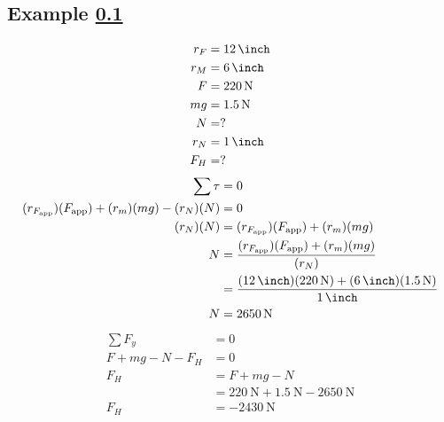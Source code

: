 \documentclass{article}
\begin{document}
\subsection{Example \ref{example:2}} \label{example:2}
\begin{align*}
	r_F & = \SI{12}{\inch} \\
	r_M & = \SI{6}{\inch} \\
	F & = \SI{220}{\newton} \\
	mg & = \SI{1.5}{\newton} \\
	N & = ? \\
	r_N & = \SI{1}{\inch} \\
	F_H & = ?
\end{align*}
\begin{align*}
	\sum \tau & = 0 \\
	(r_{F_\text{app}})(F_\text{app}) + (r_m)(mg) - (r_N)(N) & = 0 \\
	(r_N)(N) & = (r_{F_\text{app}})(F_\text{app}) + (r_m)(mg) \\
	N & = \frac{(r_{F_\text{app}})(F_\text{app}) + (r_m)(mg)}{(r_N)} \\
	  & = \frac{ (\SI{12}{\inch})(\SI{220}{\newton}) + (\SI{6}{\inch})(\SI{1.5}{\newton}) }{\SI{1}{\inch}} \\
	N & = \SI{2650}{\newton}
\end{align*}
\begin{align*}
	\sum F_y & = 0 \\
	F + mg - N - F_H & = 0 \\
	F_H & = F + mg - N \\
		& = \SI{220}{\newton} + \SI{1.5}{\newton} - \SI{2650}{\newton} \\
	F_H & = \SI{-2430}{\newton}
\end{align*}
\end{document}
